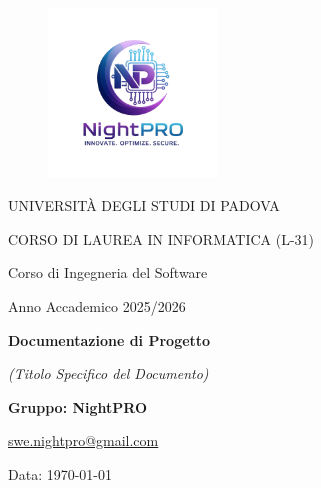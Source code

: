 \documentclass[a4paper, 11pt, oneside]{scrartcl} %
\begin{document}
\thispagestyle{empty}
\begin{titlepage}
    \centering
    
\begin{figure}
    \centering
    \includegraphics[width=0.4\textwidth]{src/immagini/logo.jpg}
\end{figure}

    \vfill
    
    {\small UNIVERSITÀ DEGLI STUDI DI PADOVA \par}
    {\small CORSO DI LAUREA IN INFORMATICA (L-31) \par}
    \vspace{0.5cm}
    {\large Corso di Ingegneria del Software \par}
    {\small Anno Accademico 2025/2026 \par}


    
    \vfill
    
    {\Huge \bfseries Documentazione di Progetto \par}
    
    \vspace{1cm}
    
    {\Large \itshape (Titolo Specifico del Documento) \par} 
    
    \vfill
    
    {\Large \bfseries Gruppo: NightPRO \par}
    \vspace{0.5cm}
    {\large \href{mailto:swe.nightpro@gmail.com}{swe.nightpro@gmail.com} \par}
    
    \vfill
    
    {\large Data: \today \par}

\end{titlepage}
\end{document}
